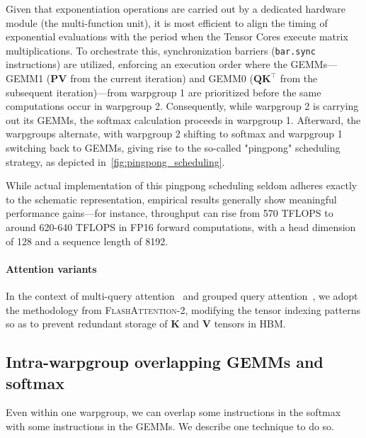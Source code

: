 Given that exponentiation operations are carried out by a dedicated hardware module (the multi-function unit), it is most efficient to align the timing of exponential evaluations with the period when the Tensor Cores execute matrix multiplications. To orchestrate this, synchronization barriers (\texttt{bar.sync} instructions) are utilized, enforcing an execution order where the GEMMs—GEMM1 (\(\mathbf{P} \mathbf{V}\) from the current iteration) and GEMM0 (\(\mathbf{Q} \mathbf{K}^\top\) from the subsequent iteration)—from warpgroup 1 are prioritized before the same computations occur in warpgroup 2. Consequently, while warpgroup 2 is carrying out its GEMMs, the softmax calculation proceeds in warpgroup 1. Afterward, the warpgroups alternate, with warpgroup 2 shifting to softmax and warpgroup 1 switching back to GEMMs, giving rise to the so-called "pingpong" scheduling strategy, as depicted in~\cref{fig:pingpong_scheduling}. 

While actual implementation of this pingpong scheduling seldom adheres exactly to the schematic representation, empirical results generally show meaningful performance gains—for instance, throughput can rise from 570 TFLOPS to around 620-640 TFLOPS in FP16 forward computations, with a head dimension of 128 and a sequence length of 8192.

\paragraph{Attention variants} In the context of multi-query attention~\citep{shazeer2019fast} and grouped query attention~\citep{ainslie2023gqa}, we adopt the methodology from \textsc{FlashAttention-2}, modifying the tensor indexing patterns so as to prevent redundant storage of $\mathbf{K}$ and $\mathbf{V}$ tensors in HBM.

\subsection{Intra-warpgroup overlapping GEMMs and softmax}

Even within one warpgroup, we can overlap some instructions in the softmax with some instructions in the GEMMs. We describe one technique to do so.

